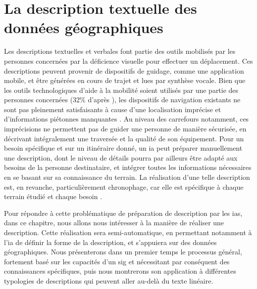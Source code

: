 \chapter{La description textuelle des données géographiques}

\label{chap:description}



Les descriptions textuelles et verbales font partie des outils mobilisés par les personnes concernées par la déficience visuelle pour effectuer un déplacement. Ces descriptions peuvent provenir de dispositifs de guidage, comme une application mobile, et être générées en cours de trajet et lues par synthèse vocale. Bien que les outils technologiques d'aide à la mobilité soient utilisés par une partie des personnes concernées (32\% d’après \citet{homere_2023}), les dispositifs de navigation existants ne sont pas pleinement satisfaisants à cause d’une localisation imprécise et d’informations piétonnes manquantes \citep{Guth2019}. Au niveau des carrefours notamment, ces imprécisions ne permettent pas de guider une personne de manière sécurisée, en décrivant intégralement une traversée et la qualité de son équipement. Pour un besoin spécifique et sur un itinéraire donné, un \gls{ia} peut préparer manuellement une description, dont le niveau de détails pourra par ailleurs être adapté aux besoins de la personne destinataire, et intégrer toutes les informations nécessaires en se basant sur sa connaissance du terrain. La réalisation d’une telle description est, en revanche, particulièrement chronophage, car elle est spécifique à chaque terrain étudié et chaque besoin \citep{kern2016}.

\newpar{}

Pour répondre à cette problématique de préparation de description par les \glspl{ia}, dans ce chapitre, nous allons nous intéresser à la manière de réaliser une description. Cette réalisation sera semi-automatique, en permettant notamment à l'\gls{ia} de définir la forme de la description, et s'appuiera sur des données géographiques. Nous présenterons dans un premier temps le processus général, fortement basé sur les capacités d’un \gls{sig} et nécessitant par conséquent des connaissances spécifiques, puis nous montrerons son application à différentes typologies de descriptions qui peuvent aller au-delà du texte linéaire.

